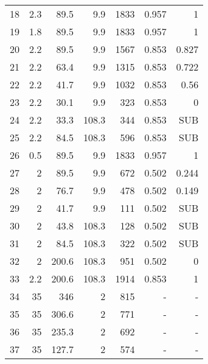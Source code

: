 \documentclass[review,3p]{elsarticle}
\begin{document}
\begin{table}[H]
\begin{tabular}{rrrrrrr}
18 & 2.3 & 89.5 & 9.9 & 1833 & 0.957 &  1 \\

19 & 1.8 & 89.5 & 9.9 & 1833 & 0.957 &  1 \\

20 & 2.2 & 89.5 & 9.9 & 1567 & 0.853 & 0.827 \\

21 & 2.2 & 63.4 & 9.9 & 1315 & 0.853 & 0.722 \\

22 & 2.2 & 41.7 & 9.9 & 1032 & 0.853 & 0.56 \\

23 & 2.2 & 30.1 & 9.9 & 323 & 0.853 &  0 \\

24 & 2.2 & 33.3 & 108.3 & 344 & 0.853 & SUB \\

25 & 2.2 & 84.5 & 108.3 & 596 & 0.853 & SUB \\

26 & 0.5 & 89.5 & 9.9 & 1833 & 0.957 &  1 \\

27 &  2 & 89.5 & 9.9 & 672 & 0.502 & 0.244 \\

28 &  2 & 76.7 & 9.9 & 478 & 0.502 & 0.149 \\

29 &  2 & 41.7 & 9.9 & 111 & 0.502 & SUB \\

30 &  2 & 43.8 & 108.3 & 128 & 0.502 & SUB \\

31 &  2 & 84.5 & 108.3 & 322 & 0.502 & SUB \\

32 &  2 & 200.6 & 108.3 & 951 & 0.502 &  0 \\

33 & 2.2 & 200.6 & 108.3 & 1914 & 0.853 &  1 \\

34 & 35 & 346 &  2 & 815 &  - &  - \\

35 & 35 & 306.6 &  2 & 771 &  - &  - \\

36 & 35 & 235.3 &  2 & 692 &  - &  - \\

37 & 35 & 127.7 &  2 & 574 &  - &  - \\
\bottomrule
\end{tabular}  

\label{tab:statePointsSCnoRH}
\end{table}
\end{document}
